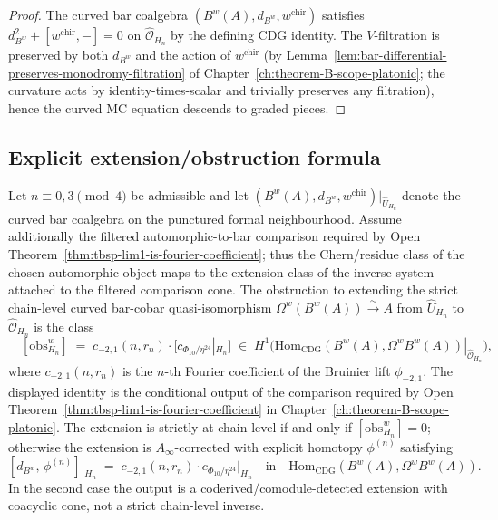 \begin{proof}
The curved bar coalgebra $(B^w(A),d_{B^w},w^{\mathrm{chir}})$
satisfies $d_{B^w}^2+[w^{\mathrm{chir}},-]=0$ on
$\widehat{\mathcal{O}}_{H_n}$ by the defining CDG identity. The
$V$-filtration is
preserved by both $d_{B^w}$ and the action of $w^{\mathrm{chir}}$
(by
Lemma~\ref{lem:bar-differential-preserves-monodromy-filtration}
of Chapter~\ref{ch:theorem-B-scope-platonic}; the curvature acts
by identity-times-scalar and trivially preserves any filtration),
hence the curved MC equation descends to graded pieces.
\end{proof}

\subsection{Explicit extension/obstruction formula}
\label{subsec:bcac-explicit-extension-obstruction}

\begin{theorem}
\label{thm:bcac-extension-obstruction-across-Hn}
\ClaimStatusConditional
{}
Let $n\equiv 0,3\pmod 4$ be admissible and let
$(B^w(A),d_{B^w},w^{\mathrm{chir}})|_{\widehat{U}_{H_n}}$ denote
the curved bar coalgebra on the punctured formal neighbourhood.
Assume additionally the filtered automorphic-to-bar comparison required
by Open Theorem~\ref{thm:tbsp-lim1-is-fourier-coefficient}; thus the
Chern/residue class of the chosen automorphic object maps to the
extension class of the inverse system attached to the filtered
comparison cone.
The obstruction to extending the strict chain-level curved bar-cobar
quasi-isomorphism $\Omega^w(B^w(A))\xrightarrow{\sim}A$ from
$\widehat{U}_{H_n}$ to $\widehat{\mathcal{O}}_{H_n}$ is the class
\[
\boxed{\quad
 [\mathrm{obs}^w_{H_n}]
 \;=\;
 c_{-2,1}(n,r_n)\cdot
 \bigl[c_{\Phi_{10}/\eta^{24}}|_{H_n}\bigr]
 \;\in\;
 H^1\!\bigl(
 \mathrm{Hom}_{\mathrm{CDG}}(B^w(A),\Omega^w B^w(A))|_{\widehat{\mathcal{O}}_{H_n}}
 \bigr),
\quad}
\]
where $c_{-2,1}(n,r_n)$ is the $n$-th Fourier coefficient of the
Bruinier lift $\phi_{-2,1}$.  The displayed identity is the conditional
output of the comparison required by Open
Theorem~\ref{thm:tbsp-lim1-is-fourier-coefficient} in
Chapter~\ref{ch:theorem-B-scope-platonic}. The extension is
strictly at chain level if and only if $[\mathrm{obs}^w_{H_n}]=0$;
otherwise the extension is $A_\infty$-corrected with explicit
homotopy $\phi^{(n)}$ satisfying
\[
 [d_{B^w},\,\phi^{(n)}]\big|_{H_n}
 \;=\;
 c_{-2,1}(n,r_n)\cdot
 c_{\Phi_{10}/\eta^{24}}\big|_{H_n}
 \quad
 \text{in}\quad
 \mathrm{Hom}_{\mathrm{CDG}}(B^w(A),\Omega^w B^w(A)).
\]
In the second case the output is a coderived/comodule-detected
extension with coacyclic cone, not a strict chain-level inverse.
\end{theorem}

